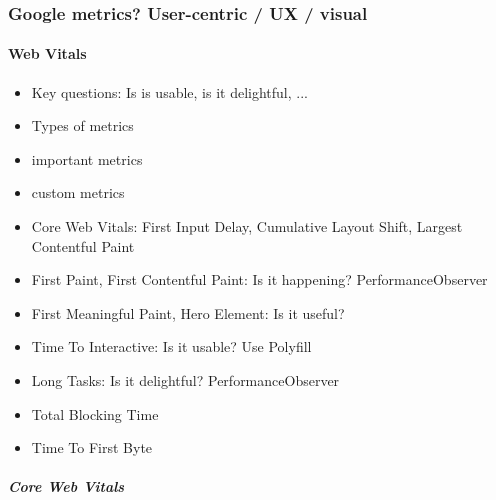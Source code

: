 












\subsubsection{Google metrics? User-centric / UX / visual}


\paragraph{Web Vitals}


\begin{itemize}
\item Key questions: Is is usable, is it delightful, ...
\item Types of metrics
\item important metrics
\item custom metrics
\end{itemize}


\begin{itemize}
\item Core Web Vitals: First Input Delay, Cumulative Layout Shift, Largest Contentful Paint
\item First Paint, First Contentful Paint: Is it happening? PerformanceObserver
\item First Meaningful Paint, Hero Element: Is it useful? 
\item Time To Interactive: Is it usable? Use Polyfill
\item Long Tasks: Is it delightful? PerformanceObserver
\item Total Blocking Time
\item Time To First Byte
\end{itemize}


\subparagraph{Core Web Vitals}

